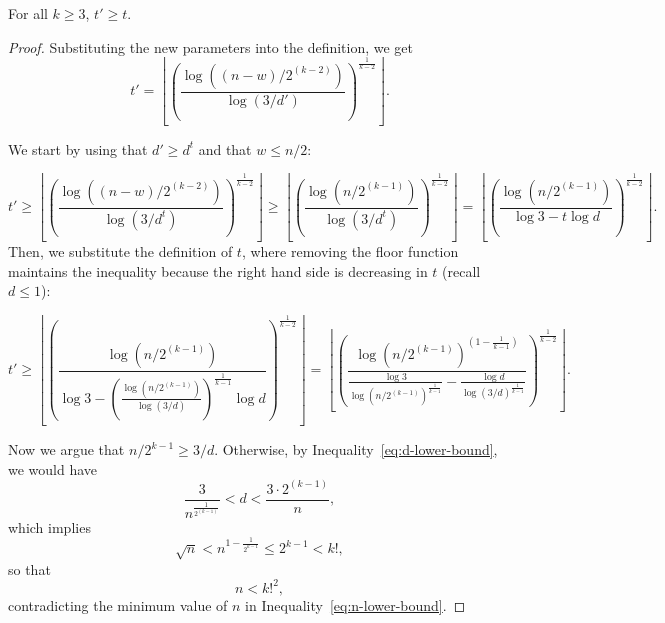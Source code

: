 \begin{lemma}\label{lm:t_prime}
    For all $k \geq 3$, $t' \geq t$.

    \begin{proof}

        Substituting the new parameters into the definition, we get
        \[
            t' = \left\lfloor \left(\frac{\log \left((n-w)/2^{(k-2)}\right)}{\log (3/d')} \right)^
            {\frac{1}{k-2}} \right\rfloor.
        \]

        We start by using that $d' \geq d^t$ and that $w \leq n/2$:

        \[
            t' \geq
            \left\lfloor \left(  \frac{\log \left((n-w)/2^{(k-2)}\right)}{\log (3/d^t)} \right)^
            {\frac{1}{k-2}} \right\rfloor \geq
            \left\lfloor \left(  \frac{\log \left(n/2^{(k-1)}\right)}{\log (3/d^t)} \right)^{\frac{1}{k-2}} \right\rfloor =
            \left\lfloor \left(  \frac{\log \left(n / 2^{(k-1)}\right)}{\log 3 - t \log d} \right)^
            {\frac{1}{k-2}} \right\rfloor.
        \]
        Then, we substitute the definition of $t$, where removing the floor function
        maintains the inequality because the right hand side is decreasing in $t$ (recall $d \leq 1$):

        \begin{equation} \label{eq:t_prime}
            t' \geq
            \left\lfloor \left(  \frac{\log \left(n / 2^{(k-1)}\right)}
            {\log 3 - \left(  \frac{\log \left(n / 2^{(k-1)}\right)}{\log (3/d)} \right)^{\frac{1}{k-1}}  \log d} \right)^
            {\frac{1}{k-2}} \right\rfloor
            =
            \left\lfloor \left(  \frac{\log \left(n / 2^{(k-1)}\right)^{\left(1-\frac{1}{k-1}\right)}}
            {\frac{\log 3}{\log\left(n / 2^{(k-1)}\right)^{\frac{1}{k-1}}} - \frac{\log d}{\log (3/d)^{\frac{1}{k-1}}} }
            \right)^{\frac{1}{k-2}} \right\rfloor.
        \end{equation}

        Now we argue that $n/2^{k-1} \geq 3/d$.
        Otherwise, by Inequality~\eqref{eq:d-lower-bound}, we would have
        \[
            \frac{3}{n^{\frac{1}{2^{(k-1)}}}} < d < \frac{3 \cdot 2^{(k-1)}}{n},
        \]
        which implies
        \[
            \sqrt{n} < n^{1 - \frac{1}{2^{k-1}}} \leq 2^{k-1} < k!,
        \]
        so that
        \[
            n < k!^2,
        \]
        contradicting the minimum value of $n$ in Inequality~\eqref{eq:n-lower-bound}.


\end{proof}
\end{lemma}
